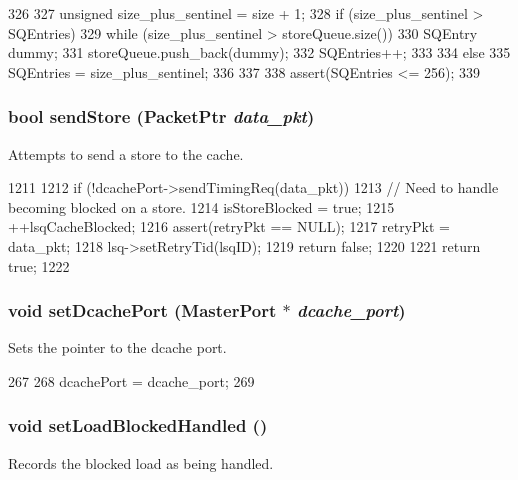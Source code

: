 \begin{DoxyCode}
326 {
327     unsigned size_plus_sentinel = size + 1;
328     if (size_plus_sentinel > SQEntries) {
329         while (size_plus_sentinel > storeQueue.size()) {
330             SQEntry dummy;
331             storeQueue.push_back(dummy);
332             SQEntries++;
333         }
334     } else {
335         SQEntries = size_plus_sentinel;
336     }
337 
338     assert(SQEntries <= 256);
339 }
\end{DoxyCode}
\hypertarget{classLSQUnit_a268a51a93dbdda9a0cff48ba036e673e}{
\subsubsection[{sendStore}]{\setlength{\rightskip}{0pt plus 5cm}bool sendStore ({\bf PacketPtr} {\em data\_\-pkt})}}
\label{classLSQUnit_a268a51a93dbdda9a0cff48ba036e673e}
Attempts to send a store to the cache. 


\begin{DoxyCode}
1211 {
1212     if (!dcachePort->sendTimingReq(data_pkt)) {
1213         // Need to handle becoming blocked on a store.
1214         isStoreBlocked = true;
1215         ++lsqCacheBlocked;
1216         assert(retryPkt == NULL);
1217         retryPkt = data_pkt;
1218         lsq->setRetryTid(lsqID);
1219         return false;
1220     }
1221     return true;
1222 }
\end{DoxyCode}
\hypertarget{classLSQUnit_a8d77cc755c7a424f4eb80130fb627012}{
\subsubsection[{setDcachePort}]{\setlength{\rightskip}{0pt plus 5cm}void setDcachePort ({\bf MasterPort} $\ast$ {\em dcache\_\-port})}}
\label{classLSQUnit_a8d77cc755c7a424f4eb80130fb627012}
Sets the pointer to the dcache port. 


\begin{DoxyCode}
267 {
268     dcachePort = dcache_port;
269 }
\end{DoxyCode}
\hypertarget{classLSQUnit_ac8bfb1e163f7ba2261d702623226973d}{
\subsubsection[{setLoadBlockedHandled}]{\setlength{\rightskip}{0pt plus 5cm}void setLoadBlockedHandled ()}}
\label{classLSQUnit_ac8bfb1e163f7ba2261d702623226973d}
Records the blocked load as being handled. 


